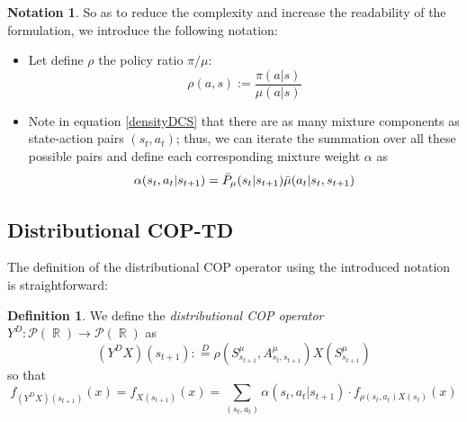 \documentclass[12pt,a4paper,openright,twoside]{article}
\DeclareMathOperator*{\R}{\mathbb{R}}
\numberwithin{equation}{section}
\theoremstyle{definition}
\newtheorem{definition}{Definition}
\newtheorem*{notation}{Notation}
\theoremstyle{remark}
\theoremstyle{plain}
\begin{document}
\begin{notation}
	So as to reduce the complexity and increase the readability of the formulation, we introduce the following notation:
	
	\begin{itemize}
		\item Let define $\rho$ the policy ratio $\pi / \mu$:
		\begin{equation*}
			\rho(a,s) := \frac{\pi(a|s)}{\mu(a|s)}
		\end{equation*}

	\item Note in equation \ref{densityDCS} that there are as many mixture components as state-action pairs $(s_t,a_t)$; thus, we can iterate the summation over all these possible pairs and define each corresponding mixture weight $\alpha$ as
		\begin{equation*}
			\alpha(s_{t},a_{t}|s_{t+1}) = \Bar{P}_\mu (s_{t} | s_{t+1}) \Bar{\mu}(a_t|s_{t},s_{t+1}) 
		\end{equation*}
	\end{itemize}
\end{notation}


\subsection{Distributional COP-TD}

The definition of the distributional COP operator using the introduced notation is straightforward:

\begin{definition} \label{defDistCOPoperator}
	We define the \textit{distributional COP operator} $Y^D: \mathscr{P}(\R) \rightarrow \mathscr{P}(\R)$ as 
	\begin{equation*}
		(Y^D X)(s_{t+1}) :\stackrel{D}{=} \rho(S^{\mu}_{s_{t+1}},A^{\mu}_{s_{t},s_{t+1}}) X(S^{\mu}_{s_{t+1}})
	\end{equation*}
	so that 
	\begin{equation*}
		f_{(Y^D X)(s_{t+1})}(x) = f_{X(s_{t+1})}(x) = \sum_{(s_{t},a_{t})} \alpha(s_{t},a_{t}|s_{t+1}) \cdot f_{\rho(s_{t},a_{t}) X(s_{t})}(x)
	\end{equation*}
\end{definition}
\end{document}
